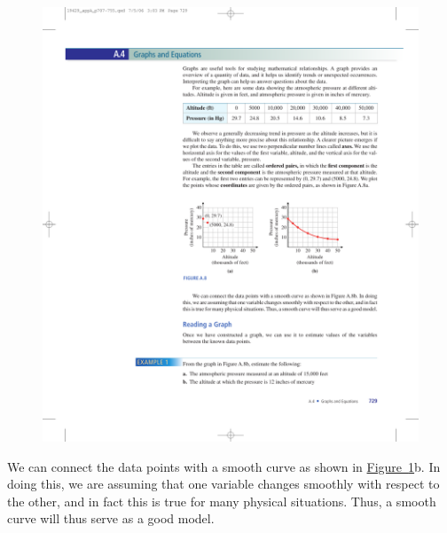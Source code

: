 \documentclass[10pt,]{book}
\theoremstyle{plain}
\theoremstyle{definition}
\theoremstyle{definition}
\theoremstyle{definition}
\numberwithin{equation}{part}
\begin{document}
\begin{figure}
\centering
\includegraphics[width=1\linewidth]{images/fig-pressure-vs-altitude}
\caption{\label{fig-pressure-vs-altitude}}
\end{figure}
%
\par
We can connect the data points with a smooth curve as shown in \hyperref[fig-pressure-vs-altitude]{Figure~\ref{fig-pressure-vs-altitude}}b. In doing this, we are assuming that one variable changes smoothly with respect to the other, and in fact this is true for many physical situations. Thus, a smooth curve will thus serve as a good model.%
\typeout{************************************************}
\typeout{************************************************}
\end{document}
